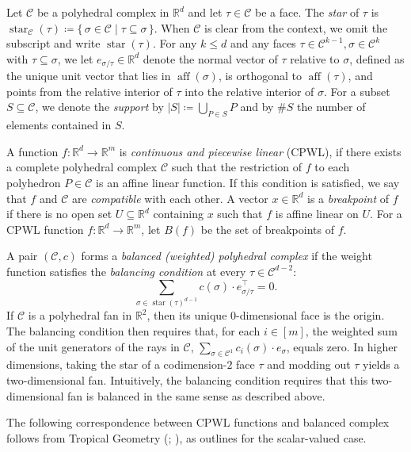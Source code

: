 \documentclass{article}
\theoremstyle{definition}
\newcommand{\aff}{\operatorname{aff}}
\newcommand{\R}{\mathbb{R}}
\newcommand{\complex}{\mathcal{C}}
\newcommand{\breakpoints}[1]{B({#1})}
\newcommand{\str}{\operatorname{star}}
\begin{document}
Let $\complex$ be a polyhedral complex in $\R^d$ and let $\tau \in \complex$ be a face.
The \emph{star} of $\tau$ is
\(
\str_\complex(\tau) \coloneqq \{\, \sigma \in \complex \mid \tau \subseteq \sigma \,\}.
\)
When $\complex$ is clear from the context, we omit the subscript and write $\str(\tau)$. For any $k\leq d$ and any faces $\tau \in \complex^{k-1},\sigma \in \complex^{k}$ with $\tau \subseteq \sigma$, we let $e_{\sigma/\tau} \in \R^d$ denote the normal vector of $\tau$ relative to $\sigma$, defined as the unique unit vector that lies in $\aff(\sigma)$, is orthogonal to $\aff(\tau)$, and points from the relative interior of $\tau$ into the relative interior of $\sigma$. 
For a subset  $S \subseteq \complex$, we denote the \emph{support} by $|S| \coloneqq \bigcup_{P \in S} P$ and by $\# S$ the number of elements contained in $S$.


A function $f\colon\R^d\to\R^m$ is \emph{continuous and piecewise linear} (CPWL), if there exists a complete polyhedral complex $\complex$ such that the restriction of $f$ to each polyhedron $P\in\complex$ is an affine linear function. 
If this condition is satisfied, we say that $f$ and $\complex$ are \emph{compatible} with each other. 
A vector $x \in  \R^d$ is a \emph{breakpoint} of $f$ if there is no open set $U \subseteq \R^d$ containing $x$ such that $f$ is affine linear on $U$. 
For a CPWL function $f\colon \R^d \to \R^m$, let $\breakpoints{f} $ be the set of breakpoints of $f$. 

A pair $(\complex,c)$ forms a \emph{balanced (weighted) polyhedral complex} if the weight function satisfies the \emph{balancing condition} at every  $\tau \in \complex^{d-2}$: 
\begin{equation*}\label{eq:balancing-condition}
    \sum\limits_{\sigma \in \str(\tau)^{d-1}} c(\sigma)\cdot e_{\sigma/\tau}^\top=0.
\end{equation*}
If $\complex$ is a polyhedral fan in $\R^2$, then its unique $0$-dimensional face is the origin. The balancing condition then requires that, for each $i\in[m]$, the weighted sum of the unit generators of the rays in $\complex$, $\sum\limits_{\sigma \in \complex^{1}} c_i(\sigma)\cdot e_{\sigma}$, equals zero. 
In higher dimensions, taking the star of a codimension-$2$ face $\tau$ and modding out $\tau$ yields a two-dimensional fan. 
Intuitively, the balancing condition requires that this two-dimensional fan is balanced in the same sense as described above. 
 
 The following correspondence between CPWL functions and balanced complex follows from Tropical Geometry (\citealp[Proposition 3.3.10]{maclagan2015introduction}; \citealp[Proposition 3.3.2]{maclagan2015introduction}), as \cite{brandenburg2025decomposition} outlines for the scalar-valued case. 
\end{document}
